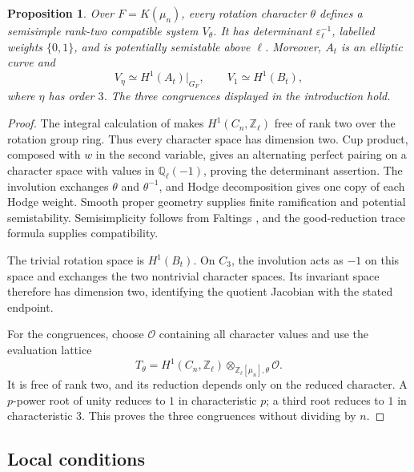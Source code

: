 \documentclass[11pt,a4paper]{article}
\newtheorem{proposition}[theorem]{Proposition}
\numberwithin{equation}{section}
\begin{document}
\begin{proposition}\label{prop:2.1}
Over \(F=K(\mu_n)\), every rotation character \(\theta\) defines a semisimple rank-two compatible system \(V_\theta\). It has determinant \(\varepsilon_\ell^{-1}\), labelled weights \(\{0,1\}\), and is potentially semistable above \(\ell\). Moreover, \(A_t\) is an elliptic curve and
\begin{equation*}
V_\eta\simeq H^1(A_t)|_{G_F},\qquad
V_1\simeq H^1(B_t),
\end{equation*}
where \(\eta\) has order \(3\). The three congruences displayed in the introduction hold.
\end{proposition}

\begin{proof}
The integral calculation of \cite[Proposition~4.2]{O} makes \(H^1(C_n,\mathbb Z_\ell)\) free of rank two over the rotation group ring. Thus every character space has dimension two. Cup product, composed with \(w\) in the second variable, gives an alternating perfect pairing on a character space with values in \(\mathbb Q_\ell(-1)\), proving the determinant assertion. The involution exchanges \(\theta\) and \(\theta^{-1}\), and Hodge decomposition gives one copy of each Hodge weight. Smooth proper geometry supplies finite ramification and potential semistability. Semisimplicity follows from Faltings \cite{F}, and the good-reduction trace formula supplies compatibility.

The trivial rotation space is \(H^1(B_t)\). On \(C_3\), the involution acts as \(-1\) on this space and exchanges the two nontrivial character spaces. Its invariant space therefore has dimension two, identifying the quotient Jacobian with the stated endpoint.

For the congruences, choose \(\mathcal O\) containing all character values and use the evaluation lattice
\begin{equation*}
T_\theta=H^1(C_n,\mathbb Z_\ell)
\otimes_{\mathbb Z_\ell[\mu_n],\theta}\mathcal O.
\end{equation*}
It is free of rank two, and its reduction depends only on the reduced character. A \(p\)-power root of unity reduces to \(1\) in characteristic \(p\); a third root reduces to \(1\) in characteristic \(3\). This proves the three congruences without dividing by \(n\).
\end{proof}

\subsection*{Local conditions}
\end{document}
